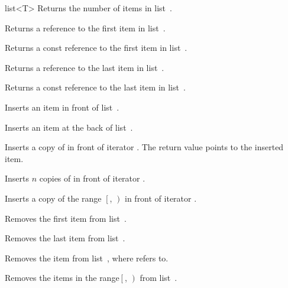 \begin{ccClassTemplate} {list<T>}
	{Returns the number of items in list~\ccVar.}

       {Returns a reference to the first item in list~\ccVar.}

\renewcommand{\ccTagRmTrailingConst}{\ccFalse}
       {Returns a const reference to the first item in list~\ccVar.}
\renewcommand{\ccTagRmTrailingConst}{\ccTrue}

       {Returns a reference to the last item in list~\ccVar.}

\renewcommand{\ccTagRmTrailingConst}{\ccFalse}
       {Returns a const reference to the last item in list~\ccVar.}
\renewcommand{\ccTagRmTrailingConst}{\ccTrue}



       {Inserts an item in front of list~\ccVar.}

       {Inserts an item at the back of list~\ccVar.}

 {Inserts a copy of  in front of iterator .
  The return value points to the inserted item.}

 {Inserts $n$ copies of  in front of iterator .}


 {Inserts a copy of the range $\left[\right.$, $\left.\right)$
  in front of iterator .}


 {Removes the first item from list~\ccVar.}

 {Removes the last item from list~\ccVar.}

 {Removes the item from list~\ccVar, where  refers to.}

 {Removes the items in the range$\left[\right.$, 
  $\left.\right)$ from list~\ccVar.}




\end{ccClassTemplate} 
